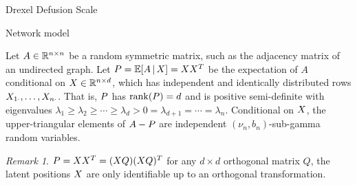\documentclass[aspectratio=169]{beamer}
\theoremstyle{remark}
\newtheorem*{remark}{Remark}
\begin{document}
\begin{frame}{Drexel Defusion Scale}

\end{frame}

\begin{frame}{Network model}


    \begin{definition}
        Let $A \in \mathbb{R}^{n \times n}$ be a random symmetric matrix, such as the adjacency matrix of an undirected graph. Let $\Apop = \E[\X]{A} = \X \X^T$ be the expectation of $A$ conditional on $X \in \mathbb{R}^{n \times d}$, which has independent and identically distributed rows $X_{1 \cdot}, \dots, X_{n \cdot}$. That is, $P$ has $\rank \paren*{\Apop} = d$ and is positive semi-definite with eigenvalues $\lambda_1 \ge \lambda_2 \ge \cdots \ge \lambda_d > 0 = \lambda_{d+1} = \cdots = \lambda_n$. Conditional on $X$, the upper-triangular elements of $A - P$ are independent $(\nu_n, b_n)$-sub-gamma random variables.
    \end{definition}

    \begin{remark}
        $P = X X^T = (X Q) (X Q)^T$ for any $d \times d$ orthogonal matrix $Q$, the latent positions $X$ are only identifiable up to an orthogonal transformation.
    \end{remark}

\end{frame}

% 
% 
\end{document}
